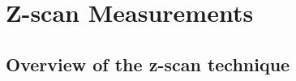 \documentclass[12pt,twoside,a4paper]{article}
\numberwithin{equation}{subsection}
\numberwithin{figure}{subsection}
\def\Xint#1{\mathchoice
{\XXint\displaystyle\textstyle{#1}}%
{\XXint\textstyle\scriptstyle{#1}}%
{\XXint\scriptstyle\scriptscriptstyle{#1}}%
{\XXint\scriptscriptstyle\scriptscriptstyle{#1}}%
\!\int}
\def\XXint#1#2#3{{\setbox0=\hbox{$#1{#2#3}{\int}$ }\vcenter{\hbox{$#2#3$ }}\kern-.6\wd0}}
\def\dashint{\Xint-}
\begin{document}
% 
% 
% 
% 
% 
% 
% 
% 
% 

\section{Z-scan Measurements} \label{chap:zscan}

\subsection{Overview of the z-scan technique} \label{chap:zscan_overview}
\end{document}
